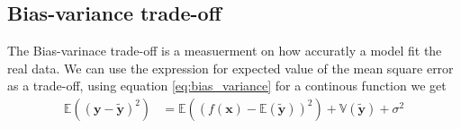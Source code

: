 \subsection{Bias-variance trade-off}
The Bias-varinace trade-off is a measuerment on how accuratly a model fit the real data. We can use the expression for expected value of 
the mean square error as a trade-off, using equation \ref{eq:bias_variance} for a continous function we get 
\begin{align}\label{eq:trade_off}
    \mathbb{E}((\boldsymbol{y} - \boldsymbol{\tilde{y}})^{2}) &= \mathbb{E}((f(\boldsymbol{x}) - \mathbb{E}(\boldsymbol{\tilde{y}}))^{2}) + \mathbb{V}(\boldsymbol{\tilde{y}}) + \sigma^{2}
\end{align}

